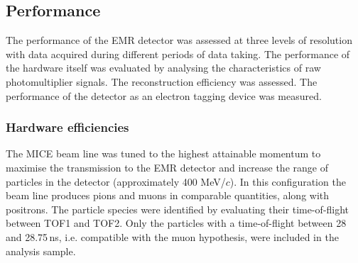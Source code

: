 \subsection{Performance}
\label{SubSect:EMR_Performance}

The performance of the EMR detector was assessed at three levels of resolution with data acquired during different periods of data taking.
The performance of the hardware itself was evaluated by analysing the characteristics of raw photomultiplier signals. The reconstruction efficiency was assessed. The performance of the detector as an electron tagging device was measured.

\subsubsection{Hardware efficiencies}
The MICE beam line was tuned to the highest attainable momentum to maximise the transmission to the EMR detector and increase the range of particles in the detector (approximately 400 MeV/$c$). In this configuration the beam line produces pions and muons in comparable quantities, along with positrons. The particle species were identified by evaluating their time-of-flight between TOF1 and TOF2.
Only the particles with a time-of-flight between 28 and 28.75\,ns, i.e. compatible with the muon hypothesis, were included in the analysis sample.


